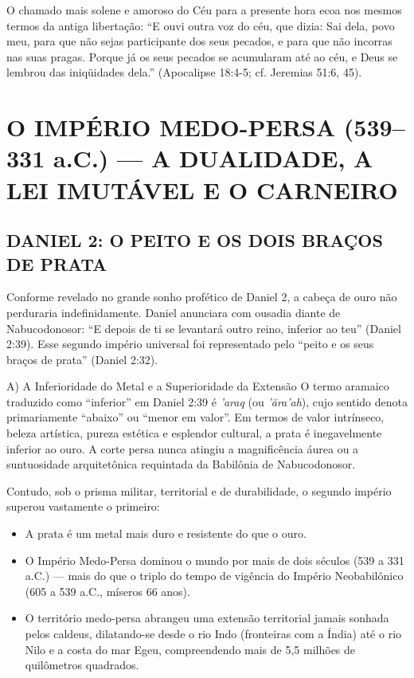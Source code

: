 \documentclass[11pt,a4paper,openany]{book}
\begin{document}
O chamado mais solene e amoroso do Céu para a presente hora ecoa nos mesmos termos da antiga libertação:
``E ouvi outra voz do céu, que dizia: Sai dela, povo meu, para que não sejas participante dos seus pecados, e para que não incorras nas suas pragas. Porque já os seus pecados se acumularam até ao céu, e Deus se lembrou das iniqüidades dela.'' (Apocalipse 18:4-5; cf. Jeremias 51:6, 45).



\section{O IMPÉRIO MEDO-PERSA (539–331 a.C.) — A DUALIDADE, A LEI IMUTÁVEL E O CARNEIRO}



\subsection{DANIEL 2: O PEITO E OS DOIS BRAÇOS DE PRATA}


Conforme revelado no grande sonho profético de Daniel 2, a cabeça de ouro não perduraria indefinidamente. Daniel anunciara com ousadia diante de Nabucodonosor: ``E depois de ti se levantará outro reino, inferior ao teu'' (Daniel 2:39). Esse segundo império universal foi representado pelo ``peito e os seus braços de prata'' (Daniel 2:32).

A) A Inferioridade do Metal e a Superioridade da Extensão
O termo aramaico traduzido como ``inferior'' em Daniel 2:39 é \textit{'araq} (ou \textit{'ăra'ah}), cujo sentido denota primariamente ``abaixo'' ou ``menor em valor''. Em termos de valor intrínseco, beleza artística, pureza estética e esplendor cultural, a prata é inegavelmente inferior ao ouro. A corte persa nunca atingiu a magnificência áurea ou a suntuosidade arquitetônica requintada da Babilônia de Nabucodonosor.

Contudo, sob o prisma militar, territorial e de durabilidade, o segundo império superou vastamente o primeiro:
\begin{itemize}
  \item A prata é um metal mais duro e resistente do que o ouro.
  \item O Império Medo-Persa dominou o mundo por mais de dois séculos (539 a 331 a.C.) — mais do que o triplo do tempo de vigência do Império Neobabilônico (605 a 539 a.C., míseros 66 anos).
  \item O território medo-persa abrangeu uma extensão territorial jamais sonhada pelos caldeus, dilatando-se desde o rio Indo (fronteiras com a Índia) até o rio Nilo e a costa do mar Egeu, compreendendo mais de 5,5 milhões de quilômetros quadrados.
\end{itemize}
\end{document}
